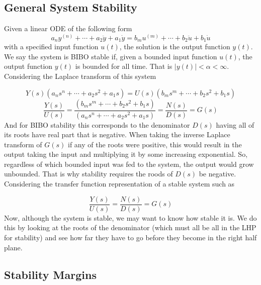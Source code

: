 \subsection{General System Stability}

Given a linear ODE of the following form
\begin{equation*}
  a_{n}y^{(n)}+\cdots+a_{2}\ddot{y}+a_{1}\dot{y}=b_{m}u^{(m)}+\cdots+b_{2}\ddot{u}+b_{1}\dot{u}
\end{equation*}
with a specified input function $u(t)$, the solution is the output function $y(t)$.
We say the system is BIBO stable if, given a bounded input function $u(t)$, the output function $y(t)$ is bounded for all time.
That is $|y(t)|<\alpha<\infty$.
Considering the Laplace transform of this system

\begin{equation*}
  Y(s)(a_{n}s^{n}+\cdots+a_{2}s^{2}+a_{1}s)=U(s)(b_{m}s^{m}+\cdots+b_{2}s^{2}+b_{1}s)
\end{equation*}
\begin{equation*}
  \frac{Y(s)}{U(s)}=\frac{(b_{m}s^{m}+\cdots+b_{2}s^{2}+b_{1}s)}{(a_{n}s^{n}+\cdots+a_{2}s^{2}+a_{1}s)}=
  \frac{N(s)}{D(s)}=G(s)
\end{equation*}
And for BIBO stability this corresponds to the denominator $D(s)$ having all of its roots have real part that is negative.
When taking the inverse Laplace transform of $G(s)$ if any of the roots were positive, this would result in the output taking the input and multiplying it by some increasing exponential.
So, regardless of which bounded input was fed to the system, the output would grow unbounded.
That is why stability requires the roods of $D(s)$ be negative.
Considering the transfer function representation of a stable system such as

\begin{equation*}
  \frac{Y(s)}{U(s)}=\frac{N(s)}{D(s)}=G(s)
\end{equation*}
Now, although the system is stable, we may want to know how stable it is.
We do this by looking at the roots of the denominator (which must all be all in the LHP for stability) and see how far they have to go before they become in the right half plane.

\subsection{Stability Margins}

